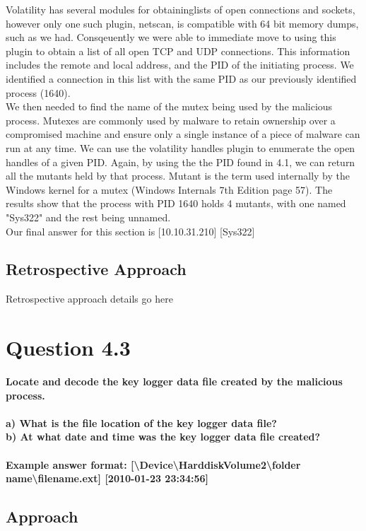 Volatility has several modules for obtaininglists of open connections and sockets, however only one such plugin, netscan, is compatible with 64 bit memory dumps, such as we had. Consqeuently we were able to immediate move to using this plugin to obtain a list of all open TCP and UDP connections. This information includes the remote and local address, and the PID of the initiating process. We identified a connection in this list with the same PID as our previously identified process (1640). \\
We then needed to find the name of the mutex being used by the malicious process. Mutexes are commonly used by malware to retain ownership over a compromised machine and ensure only a single instance of a piece of malware can run at any time. We can use the volatility handles plugin to enumerate the open handles of a given PID. Again, by using the the PID found in 4.1, we can return all the mutants held by that process. Mutant is the term used internally by the Windows kernel for a mutex (Windows Internals 7th Edition page 57). The results show that the process with PID 1640 holds 4 mutants, with one named "Sys322" and the rest being unnamed.\\
Our final answer for this section is [10.10.31.210] [Sys322]

\subsection{Retrospective Approach}
Retrospective approach details go here

\section{Question 4.3}
\textbf{Locate and decode the key logger data file created by the malicious
process.\\
\\a) What is the file location of the key logger data file?
\\b) At what date and time was the key logger data file created?
\\\\
Example answer format:
[\textbackslash{}Device\textbackslash{}HarddiskVolume2\textbackslash{}folder
name\textbackslash{}filename.ext] [2010-01-23 23:34:56]}
\subsection{Approach}

